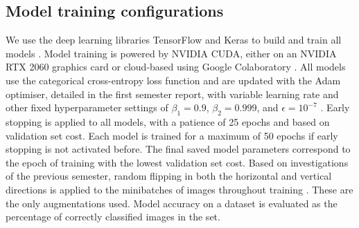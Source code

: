 \documentclass[12pt]{article}
\begin{document}


\subsection{Model training configurations}
We use the deep learning libraries TensorFlow and Keras to build and train all models \cite{Abadi16, Gulli17}. Model training is powered by NVIDIA CUDA, either on an NVIDIA RTX 2060 graphics card or cloud-based using Google Colaboratory \cite{Cook12, Bisong19}. All models use the categorical cross-entropy loss function and are updated with the Adam optimiser, detailed in the first semester report, with variable learning rate and other fixed hyperparameter settings of $\beta_1=0.9$, $\beta_2=0.999$, and $\epsilon=10^{-7}$ \cite{Heaton20, Kingma14}. Early stopping is applied to all models, with a patience of 25 epochs and based on validation set cost. Each model is trained for a maximum of 50 epochs if early stopping is not activated before. The final saved model parameters correspond to the epoch of training with the lowest validation set cost. Based on investigations of the previous semester, random flipping in both the horizontal and vertical directions is applied to the minibatches of images throughout training \cite{Heaton20}. These are the only augmentations used. Model accuracy on a dataset is evaluated as the percentage of correctly classified images in the set. 
\end{document}
